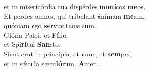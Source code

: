 \oddverse et in misericórdia tua dispérdes ini\textbf{mí}cos \textbf{me}os.\\
\evenverse Et perdes omnes, qui tríbulant ánimam \textbf{me}am,~\*\\
\evenverse quóniam ego \textbf{ser}vus \textbf{tu}us sum.\\
\oddverse Glória Patri, et \textbf{Fí}lio,~\*\\
\oddverse et Spi\textbf{rí}tui \textbf{San}cto.\\
\evenverse Sicut erat in princípio, et nunc, et \textbf{sem}per,~\*\\
\evenverse et in sǽcula sæcu\textbf{ló}rum. \textbf{A}men.\\
